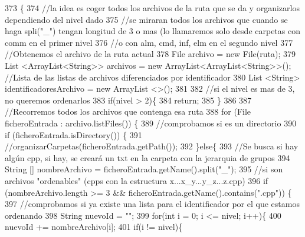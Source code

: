\begin{DoxyCode}
373                                                            \{
374         \textcolor{comment}{//la idea es coger todos los archivos de la ruta que se da y organizarlos dependiendo del nivel
       dado}
375         \textcolor{comment}{//se miraran todos los archivos que cuando se haga spli("\_") tengan longitud de 3 o mas (lo
       llamaremos solo desde carpetas con comm en el primer nivel}
376         \textcolor{comment}{//o con alm, cmd, inf, elm en el segundo nivel}
377         \textcolor{comment}{//Obtenemos el archivo de la ruta actual}
378         File archivo = \textcolor{keyword}{new} File(ruta);
379         List <ArrayList<String>> archivos = \textcolor{keyword}{new} ArrayList<ArrayList<String>>(); \textcolor{comment}{//Lista de las listas de
       archivos diferenciados por identificador}
380         List <String> identificadoresArchivo = \textcolor{keyword}{new} ArrayList <>();
381         
382         \textcolor{comment}{//si el nivel es mas de 3, no queremos ordenarlos}
383         \textcolor{keywordflow}{if}(nivel > 2)\{
384             \textcolor{keywordflow}{return};
385         \}
386         
387         \textcolor{comment}{//Recorremos todos los archivos que contenga esa ruta}
388         \textcolor{keywordflow}{for} (File ficheroEntrada : archivo.listFiles()) \{
389             \textcolor{comment}{//comprobamos si es un directorio}
390             \textcolor{keywordflow}{if} (ficheroEntrada.isDirectory()) \{
391                 \textcolor{comment}{//organizarCarpetas(ficheroEntrada.getPath());}
392             \}\textcolor{keywordflow}{else}\{
393                 \textcolor{comment}{//Se busca si hay algún cpp, si hay, se creará un txt en la carpeta con la jerarquia de
       grupos}
394                 String [] nombreArchivo = ficheroEntrada.getName().split(\textcolor{stringliteral}{"\_"});
395                 \textcolor{comment}{//si son archivos "ordenables" (cpps con la estructura x...x\_y...y\_z...z.cpp)}
396                 \textcolor{keywordflow}{if} (nombreArchivo.length >= 3 && ficheroEntrada.getName().contains(\textcolor{stringliteral}{".cpp"})) \{
397                     \textcolor{comment}{//comprobamos si ya existe una lista para el identificador por el que estamos ordenando}
398                     String nuevoId = \textcolor{stringliteral}{""};
399                     \textcolor{keywordflow}{for}(\textcolor{keywordtype}{int} i = 0; i <= nivel; i++)\{
400                         nuevoId += nombreArchivo[i];
401                         \textcolor{keywordflow}{if}(i != nivel)\{

\end{DoxyCode}
